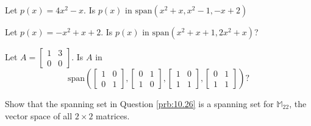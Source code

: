 \documentclass{ximera}
\begin{document}

\begin{problem}\label{prb:10.24} Let $p(x) = 4x^2-x$. Is $p(x)$ in
 $\mbox{span} \left( x^2+x, x^2-1, -x + 2 \right)$
\end{problem}

\begin{problem}\label{prb:10.25} Let $p(x) = - x^2 + x + 2 $. Is $p(x)$ in $\mbox{span} \left( x^2 + x + 1, 2x^2 + x \right)$?
\end{problem}

\begin{problem}\label{prb:10.26} Let $A = \left[ \begin{array}{rr}
1 & 3 \\
0 & 0
\end{array} \right]$. Is $A$ in
\[
\mbox{span} \left(
\left[ \begin{array}{rr}
1 & 0 \\
0 & 1
\end{array} \right], \left[ \begin{array}{rr}
0 & 1 \\
1 & 0
\end{array} \right], \left[ \begin{array}{rr}
1 & 0 \\
1 & 1
\end{array} \right], \left[ \begin{array}{rr}
0 & 1 \\
1 & 1
\end{array} \right]
\right)?
\]
\end{problem}


\begin{problem}\label{prb:10.27} Show that the spanning set in Question \ref{prb:10.26} is a spanning set for $\mathbb{M}_{22}$, the vector space of all $2 \times 2$ matrices.
\end{problem}
\end{document}
